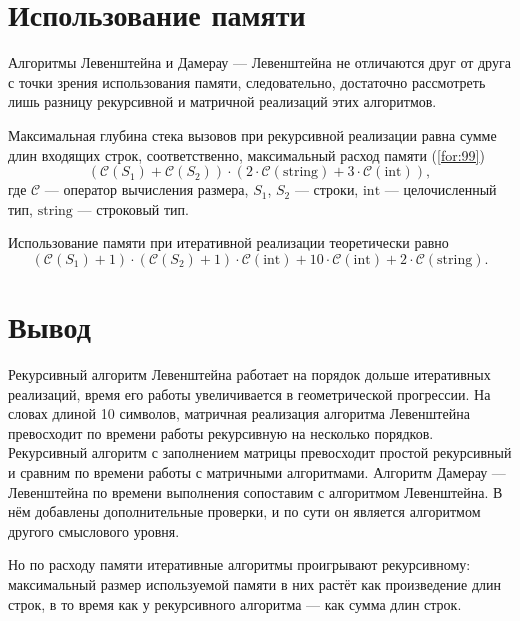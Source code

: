 \section{Использование памяти}

Алгоритмы Левенштейна и Дамерау — Левенштейна не отличаются друг от друга с точки зрения использования памяти, следовательно, достаточно рассмотреть лишь разницу рекурсивной и матричной реализаций этих алгоритмов.

Максимальная глубина стека вызовов при рекурсивной реализации равна сумме длин входящих строк, соответственно, максимальный расход памяти (\ref{for:99})
\begin{equation}
(\mathcal{C}(S_1) + \mathcal{C}(S_2)) \cdot (2 \cdot \mathcal{C}\mathrm{(string)} + 3 \cdot \mathcal{C}\mathrm{(int)}),
\label{for:99}
\end{equation}
где $\mathcal{C}$ — оператор вычисления размера, $S_1$, $S_2$ — строки, $\mathrm{int}$ — целочисленный тип, $\mathrm{string}$ — строковый тип.

Использование памяти при итеративной реализации теоретически равно
\begin{equation}
(\mathcal{C}(S_1) + 1) \cdot (\mathcal{C}(S_2) + 1) \cdot \mathcal{C}\mathrm{(int)} + 10\cdot \mathcal{C}\mathrm{(int)} + 2 \cdot \mathcal{C}\mathrm{(string)}.
\end{equation}

\section*{Вывод}

Рекурсивный алгоритм Левенштейна работает на порядок дольше итеративных реализаций, время его работы увеличивается в геометрической прогрессии. На словах длиной 10 символов, матричная реализация алгоритма Левенштейна превосходит по времени работы рекурсивную на несколько порядков. Рекурсивный алгоритм с заполнением матрицы превосходит простой рекурсивный и сравним по времени работы с матричными алгоритмами. Алгоритм Дамерау — Левенштейна по времени выполнения сопоставим с алгоритмом Левенштейна. В нём добавлены дополнительные проверки, и по сути он является алгоритмом другого смыслового уровня.

Но по расходу памяти итеративные алгоритмы проигрывают рекурсивному: максимальный размер используемой памяти в них растёт как произведение длин строк, в то время как у рекурсивного алгоритма — как сумма длин строк.
